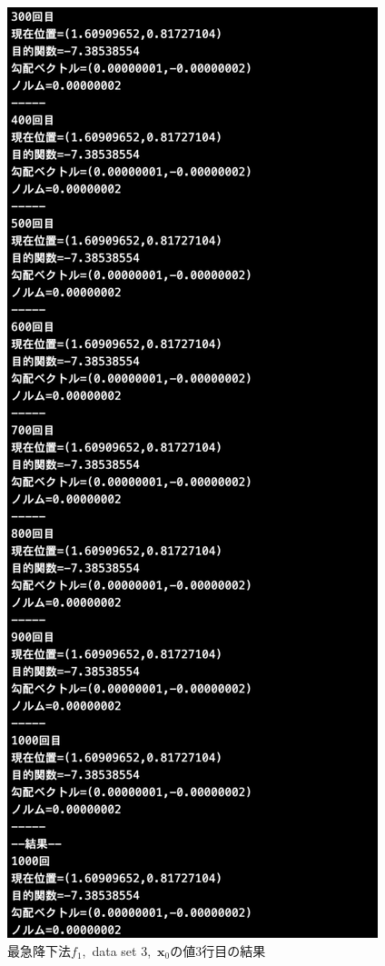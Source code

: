 \documentclass[12pt]{jarticle}
\begin{document}
\begin{figure}[h]
\begin{minipage}{0.5\hsize}
        \begin{center}
            \includegraphics[scale=0.2]{kadai1_1s_out3_3_3.png}
        \end{center}
    \end{minipage}
    \caption{最急降下法$f_1$,\ data set 3,\ $\boldsymbol{x}_0$の値3行目の結果}
\end{figure}
\end{document}
